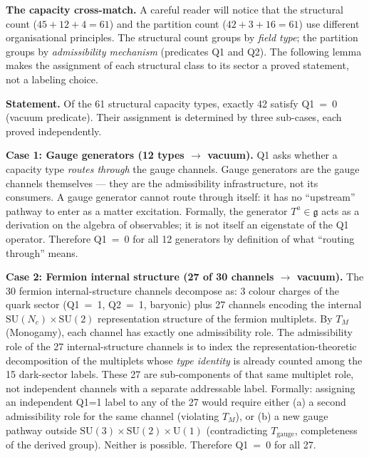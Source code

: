 \documentclass[11pt]{article}
\newcommand{\SU}{\mathrm{SU}}
\newcommand{\U}{\mathrm{U}}
\begin{document}
\smallskip
\noindent\textbf{The capacity cross-match.}\quad
A careful reader will notice that the structural count ($45 + 12 + 4 = 61$) and the partition count ($42 + 3 + 16 = 61$) use different organisational principles.  The structural count groups by \emph{field type}; the partition groups by \emph{admissibility mechanism} (predicates Q1 and Q2).  The following lemma makes the assignment of each structural class to its sector a proved statement, not a labeling choice.

\begin{tcolorbox}[apfbox, title={Lemma $L_{\mathrm{vac}}$ (Vacuum Sector Assignment)}]
\textbf{Statement.}  Of the 61 structural capacity types, exactly 42 satisfy Q1~=~0 (vacuum predicate).  Their assignment is determined by three sub-cases, each proved independently.

\medskip\noindent\textbf{Case 1: Gauge generators (12 types $\to$ vacuum).}
Q1 asks whether a capacity type \emph{routes through} the gauge channels.  Gauge generators are the gauge channels themselves --- they are the admissibility infrastructure, not its consumers.  A gauge generator cannot route through itself: it has no ``upstream'' pathway to enter as a matter excitation.  Formally, the generator $T^a \in \mathfrak{g}$ acts as a derivation on the algebra of observables; it is not itself an eigenstate of the Q1 operator.  Therefore Q1~=~0 for all 12 generators by definition of what ``routing through'' means.

\medskip\noindent\textbf{Case 2: Fermion internal structure (27 of 30 channels $\to$ vacuum).}
The 30 fermion internal-structure channels decompose as: 3 colour charges of the quark sector (Q1~=~1, Q2~=~1, baryonic) plus 27 channels encoding the internal $\mathrm{SU}(N_c) \times \mathrm{SU}(2)$ representation structure of the fermion multiplets.  By $T_M$ (Monogamy), each channel has exactly one admissibility role.  The admissibility role of the 27 internal-structure channels is to index the representation-theoretic decomposition of the multiplets whose \emph{type identity} is already counted among the 15 dark-sector labels.  These 27 are sub-components of that same multiplet role, not independent channels with a separate addressable label.  Formally: assigning an independent Q1=1 label to any of the 27 would require either (a) a second admissibility role for the same channel (violating $T_M$), or (b) a new gauge pathway outside $\SU(3) \times \SU(2) \times \U(1)$ (contradicting $T_{\mathrm{gauge}}$, completeness of the derived group).  Neither is possible.  Therefore Q1~=~0 for all 27.


\end{tcolorbox}
\end{document}
